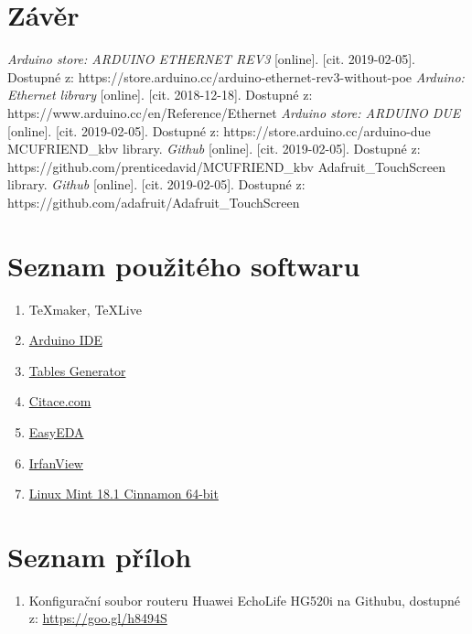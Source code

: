 \documentclass[a4paper,12pt, twoside]{article} %
\begin{document}
\section{Závěr}
%
\clearpage
\renewcommand{\refname}{Seznam použité literatury a zdrojů informací}
\begin{thebibliography}{99}
\textit{Arduino store: ARDUINO ETHERNET REV3} [online]. [cit. 2019-02-05]. Dostupné z: https://store.arduino.cc/arduino-ethernet-rev3-without-poe
\textit{Arduino: Ethernet library} [online]. [cit. 2018-12-18]. Dostupné z: https://www.arduino.cc/en/Reference/Ethernet
\textit{Arduino store: ARDUINO DUE} [online]. [cit. 2019-02-05]. Dostupné z: https://store.arduino.cc/arduino-due
MCUFRIEND\_kbv library. \textit{Github} [online]. [cit. 2019-02-05]. Dostupné z: https://github.com/prenticedavid/MCUFRIEND\_kbv
Adafruit\_TouchScreen library. \textit{Github} [online]. [cit. 2019-02-05]. Dostupné z: https://github.com/adafruit/Adafruit\_TouchScreen
\end{thebibliography}
\clearpage
{} %
\section*{Seznam použitého softwaru}
\begin{enumerate}%
	\item \TeX maker, \TeX Live
	\item \href{https://www.arduino.cc/en/main/software}{Arduino IDE}
	\item \href{https://www.tablesgenerator.com/latex_tables}{Tables Generator}
	\item \href{https://www.citace.com/citace-pro}{Citace.com}
	\item \href{https://easyeda.com/}{EasyEDA}
	\item \href{https://www.irfanview.com/}{IrfanView}
	\item \href{https://linuxmint.com/}{Linux Mint 18.1 Cinnamon 64-bit}
\end{enumerate}
\section*{Seznam příloh} 
\begin{enumerate}[{Příloha} 1:]
\item \label{priloha:github_router_conf} Konfigurační soubor routeru Huawei EchoLife HG520i na Githubu, dostupné z: \href{https://goo.gl/h8494S}{https://goo.gl/h8494S}
\end{enumerate}
\end{document}
